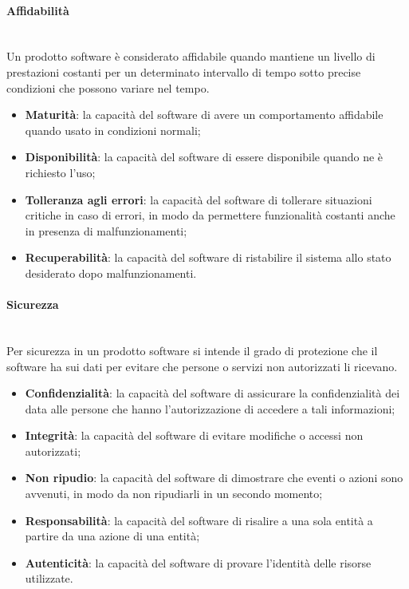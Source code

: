 	\paragraph{Affidabilità} \mbox{}\\
	Un prodotto software è considerato affidabile quando mantiene un livello di prestazioni costanti per un determinato intervallo di tempo sotto precise condizioni che possono variare nel tempo.
	\begin{itemize} \mbox{}\\
		\item \textbf{Maturità}: la capacità del software di avere un comportamento affidabile quando usato in condizioni normali;
		\item \textbf{Disponibilità}: la capacità del software di essere disponibile quando ne è richiesto l'uso;
		\item \textbf{Tolleranza agli errori}: la capacità del software di tollerare situazioni critiche in caso di errori, in modo da permettere funzionalità costanti anche in presenza di malfunzionamenti;
		\item \textbf{Recuperabilità}: la capacità del software di ristabilire il sistema allo stato desiderato dopo malfunzionamenti.
	\end{itemize}
	\paragraph{Sicurezza} \mbox{}\\
	Per sicurezza in un prodotto software si intende il grado di protezione che il software ha sui dati per evitare che persone o servizi non autorizzati li ricevano.
	\begin{itemize}
		\item \textbf{Confidenzialità}: la capacità del software di assicurare la confidenzialità dei data alle persone che hanno l'autorizzazione di accedere a tali informazioni;
		\item \textbf{Integrità}: la capacità del software di evitare modifiche o accessi non autorizzati;
		\item \textbf{Non ripudio}: la capacità del software di dimostrare che eventi o azioni sono avvenuti, in modo da non ripudiarli in un secondo momento;
		\item \textbf{Responsabilità}: la capacità del software di risalire a una sola entità a partire da una azione di una entità;
		\item \textbf{Autenticità}: la capacità del software di provare l'identità delle risorse utilizzate.
	\end{itemize}
